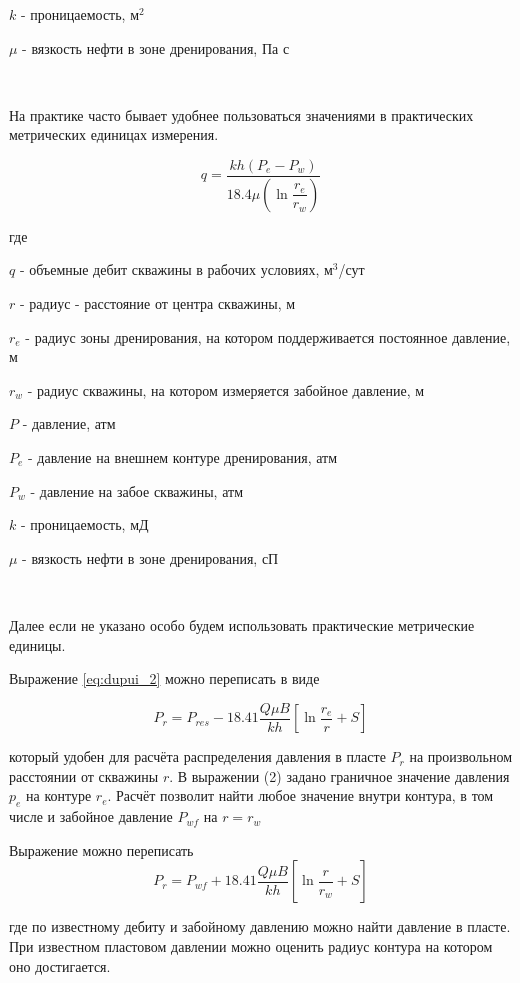 $k$ - проницаемость, м$^2$

$\mu$ - вязкость нефти в зоне дренирования, Па с

\

На практике часто бывает удобнее пользоваться значениями в практических метрических единицах измерения. 

\begin{equation} \label{eq:dupui_2}
q=\frac{kh\left(P_e-P_w\right)}{ 18.4 \mu\left(\ln{\dfrac{r_e}{r_w}}\right)}
\end{equation}

где 

$q$ - объемные дебит скважины в рабочих условиях, м$^3$/сут

$r$ -  радиус - расстояние от центра скважины, м

$r_e$ -  радиус зоны дренирования, на котором поддерживается постоянное давление, м

$r_w$ - радиус скважины, на котором измеряется забойное давление, м

$P$ - давление, атм

$P_e$ - давление на внешнем контуре дренирования, атм

$P_w$ - давление на забое скважины, атм

$k$ - проницаемость, мД

$\mu$ - вязкость нефти в зоне дренирования, сП

\

Далее если не указано особо будем использовать практические метрические единицы.


Выражение \ref{eq:dupui_2} можно переписать в виде

\begin{equation}
	P_{r} = P_{res} - 18.41\dfrac{ Q\mu B }{kh} \left[ \ln\dfrac{r_e}{r} +S \right]
\end{equation}

который удобен для расчёта распределения давления в пласте $P_r$ на произвольном расстоянии от скважины $r$.
В выражении (2) задано граничное значение давления $p_e$ на контуре $r_e$. Расчёт позволит найти любое значение внутри контура, в том числе и забойное давление $P_{wf}$ на $r=r_w$

Выражение можно переписать 
\begin{equation}
	P_{r} = P_{wf} + 18.41\dfrac{ Q\mu B }{kh} \left[ \ln\dfrac{r}{r_w} +S \right]
\end{equation}

где по известному дебиту и забойному давлению можно найти давление в пласте. При известном пластовом давлении можно оценить радиус контура на котором оно достигается.

